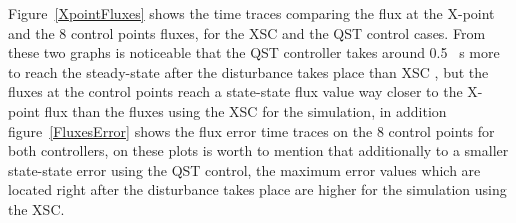 Figure~\ref{XpointFluxes} shows the time traces comparing the flux at the X-point and the 8 control points fluxes, for the XSC and the QST control cases. From these two graphs is noticeable that the QST controller takes around 0.5 ~s  more to reach the steady-state after the disturbance takes place than XSC , but the fluxes at the control points reach a state-state flux value way closer to the X-point flux than the fluxes using the  XSC for the simulation, in addition figure~\ref{FluxesError} shows the flux error time traces on the 8 control points for both controllers, on these plots is worth to mention that additionally to a smaller state-state error using the QST control, the maximum error values which are located right after the disturbance takes place are higher for the simulation using the XSC. 
\smallskip




